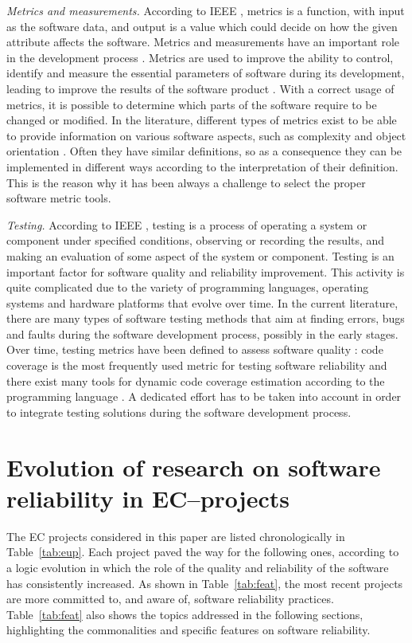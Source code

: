 \emph{Metrics and measurements.} According to IEEE \cite{radatz}, metrics is a function, with input as
the software data, and output is a value which could decide on how the given attribute affects the software.
Metrics and measurements have an important role in the development process \cite{fenton, capers}. Metrics
are used to improve the ability to control, identify and measure the essential parameters of software
during its development, leading to improve the results of the software product \cite{goodman}. With a correct
usage of metrics, it is possible to determine which parts of the software require to be changed or modified.
In the literature, different types of metrics exist to be able to provide information on various software
aspects, such as complexity \cite{mccabe} and object orientation \cite{chidamber, lorenz}. Often they have
similar definitions, so as a consequence they can be implemented in different ways according to the
interpretation of their definition. This is the reason why it has been always a challenge to select the
proper software metric tools.

\emph{Testing.} According to IEEE \cite{radatz}, testing is a process of operating a system or component
under specified conditions, observing or recording the results, and making an evaluation of some aspect of
the system or component. Testing is an important factor for software quality and reliability improvement. This
activity is quite complicated due to the variety of programming languages, operating systems and hardware
platforms that evolve over time. In the current literature, there are many types of software
testing methods \cite{myers} that aim at finding errors, bugs and faults during the software development
process, possibly in the early stages. Over time, testing metrics have been defined to assess software
quality \cite{athanasiou}: code coverage is the most frequently used metric for testing software reliability
and there exist many tools for dynamic code coverage estimation according to the programming language
\cite{horgan}. A dedicated effort has to be taken into account in order to integrate testing solutions
during the software development process.


\section{Evolution of research on software reliability in EC--projects}
\label{sec:ev}

The EC projects considered in this paper are listed chronologically in Table~\ref{tab:eup}.
Each project paved the way for the following ones, according to a logic evolution in which
the role of the quality and reliability of the software has
consistently increased. As shown in Table~\ref{tab:feat}, the most recent projects are more
committed to, and aware of, software reliability practices.
Table~\ref{tab:feat} also shows the topics addressed in the following sections, highlighting
the commonalities and specific features on software reliability.

